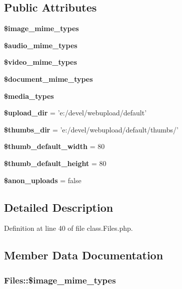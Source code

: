 \subsection*{Public Attributes}
\begin{CompactItemize}
\item 
{\bf \$image\_\-mime\_\-types}
\item 
{\bf \$audio\_\-mime\_\-types}
\item 
{\bf \$video\_\-mime\_\-types}
\item 
{\bf \$document\_\-mime\_\-types}
\item 
{\bf \$media\_\-types}
\item 
{\bf \$upload\_\-dir} = 'e:/devel/webupload/default'\label{classFiles_e810f124b690c30b3dd19e6fd79f67fc}

\item 
{\bf \$thumbs\_\-dir} = 'e:/devel/webupload/default/thumbs/'\label{classFiles_cf5c8661373aa2526dcd1df9cd8f1795}

\item 
{\bf \$thumb\_\-default\_\-width} = 80\label{classFiles_a59cbc99ff9fc3a0cfe45b00f52594e2}

\item 
{\bf \$thumb\_\-default\_\-height} = 80\label{classFiles_d672e4934a9de6d7d0177fdf1cde15f2}

\item 
{\bf \$anon\_\-uploads} = false\label{classFiles_4a9c950c97e393890469889f41e7ca25}

\end{CompactItemize}


\subsection{Detailed Description}


Definition at line 40 of file class.Files.php.

\subsection{Member Data Documentation}
\subsubsection{\setlength{\rightskip}{0pt plus 5cm}Files::\$image\_\-mime\_\-types}\label{classFiles_3affc33993db9f6fb82b1cf1df72c9c4}


